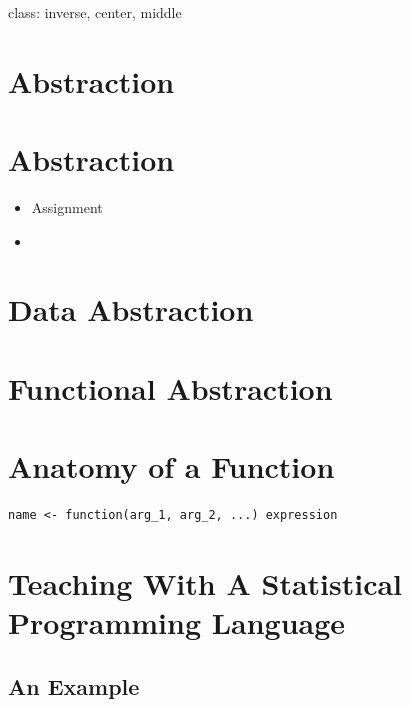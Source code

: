 \documentclass[
]{book}
\providecommand{\tightlist}{%
  \setlength{\itemsep}{0pt}\setlength{\parskip}{0pt}}
\begin{document}
class: inverse, center, middle

\hypertarget{abstraction}{%
\section{Abstraction}\label{abstraction}}

\hypertarget{abstraction-1}{%
\section{Abstraction}\label{abstraction-1}}

\begin{itemize}
\tightlist
\item
  Assignment
\item
\end{itemize}

\hypertarget{data-abstraction}{%
\section{Data Abstraction}\label{data-abstraction}}

\hypertarget{functional-abstraction}{%
\section{Functional Abstraction}\label{functional-abstraction}}

\hypertarget{anatomy-of-a-function}{%
\section{Anatomy of a Function}\label{anatomy-of-a-function}}

\begin{verbatim}
name <- function(arg_1, arg_2, ...) expression
\end{verbatim}

\hypertarget{teaching-with-a-statistical-programming-language}{%
\section{Teaching With A Statistical Programming Language}\label{teaching-with-a-statistical-programming-language}}

\hypertarget{an-example}{%
\subsection{An Example}\label{an-example}}
\end{document}
